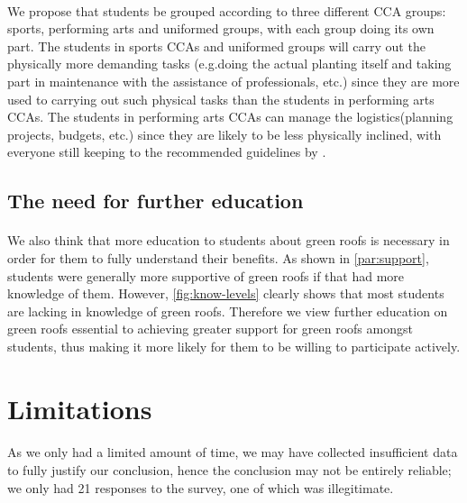 \documentclass[a4paper]{article}
\begin{document}
\begin{multicols}{2}
  \paragraph{} We propose that students be grouped according to three
  different CCA groups: sports, performing arts and uniformed groups,
  with each group doing its own part. The students in sports CCAs
  and uniformed groups will carry out the physically more demanding
  tasks (e.g.doing the actual planting itself and taking part in
  maintenance with the assistance of professionals, etc.) since they
  are more used to carrying out such physical tasks than the students in
  performing arts CCAs. The students in performing arts CCAs can manage
  the logistics(planning projects, budgets, etc.) since they are
  likely to be less physically inclined, with everyone still keeping to
  the recommended guidelines by \cite{HKGreenRoofGL}.



  \subsection{The need for further education}
  \paragraph{} We also think that more education to students about
  green roofs is necessary in order for them to fully understand their
  benefits. As shown in \cref{par:support}, students were generally more
  supportive of green roofs if that had more knowledge of them. However,
  \cref{fig:know-levels} clearly shows that most students are lacking in
  knowledge of green roofs. Therefore we view further education on
  green roofs essential to achieving greater support for green roofs
  amongst students, thus making it more likely for them to be willing
  to participate actively.

  \section{Limitations}
  \paragraph{} As we only had a limited amount of time, we may have collected
  insufficient data to fully justify our conclusion, hence the conclusion may
  not be entirely reliable; we only had 21 responses to the survey, one of
  which was illegitimate.


\end{multicols}
\end{document}
